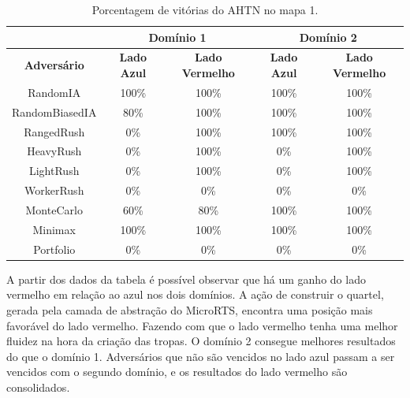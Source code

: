 \begin{table}[ht]
	\centering
	\caption{Porcentagem de vitórias do AHTN no mapa 1.}
	\label{tab:mapa1}
	\begin{tabular}{|c|cc|cc|}
		\hline
		\textbf{}           & \multicolumn{2}{c|}{\textbf{Domínio 1}}  & \multicolumn{2}{c|}{\textbf{Domínio 2}}  \\ \hline
		\textbf{Adversário} & \textbf{Lado Azul} & \textbf{Lado Vermelho} & \textbf{Lado Azul} & \textbf{Lado Vermelho} \\ \hline
		RandomIA            & 100\%              & 100\%                  & 100\%              & 100\%                  \\ \hline
		RandomBiasedIA      & 80\%               & 100\%                  & 100\%              & 100\%                  \\ \hline
		RangedRush          & 0\%                & 100\%                  & 100\%              & 100\%                  \\ \hline
		HeavyRush           & 0\%                & 100\%                  & 0\%                & 100\%                  \\ \hline
		LightRush           & 0\%                & 100\%                  & 0\%                & 100\%                  \\ \hline
		WorkerRush          & 0\%                & 0\%                    & 0\%                & 0\%                    \\ \hline
		MonteCarlo          & 60\%               & 80\%                   & 100\%              & 100\%                  \\ \hline
		Minimax             & 100\%              & 100\%                  & 100\%              & 100\%                  \\ \hline
		Portfolio           & 0\%                & 0\%                    & 0\%                & 0\%                    \\ \hline
	\end{tabular}
\end{table}

A partir dos dados da tabela é possível observar que há um ganho do lado vermelho em relação ao azul nos dois domínios. 
A ação de construir o quartel, gerada pela camada de abstração do MicroRTS, encontra uma posição mais favorável do lado vermelho.
Fazendo com que o lado vermelho tenha uma melhor fluidez na hora da criação das tropas.
O domínio 2 consegue melhores resultados do que o domínio 1.
Adversários que não são vencidos no lado azul passam a ser vencidos com o segundo domínio, e os resultados do lado vermelho são consolidados.

